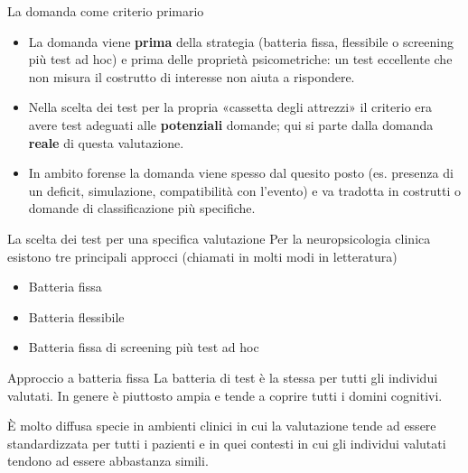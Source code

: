\documentclass[
  ignorenonframetext,
  aspectratio=169,
]{beamer}
\providecommand{\tightlist}{%
  \setlength{\itemsep}{0pt}\setlength{\parskip}{0pt}}
\begin{document}
\begin{frame}{La domanda come criterio primario}
\label{la-domanda-come-criterio-primario}
\small

\begin{itemize}
\tightlist
\item
  La domanda viene \textbf{prima} della strategia (batteria fissa,
  flessibile o screening più test ad hoc) e prima delle proprietà
  psicometriche: un test eccellente che non misura il costrutto di
  interesse non aiuta a rispondere. \pause
\item
  Nella scelta dei test per la propria «cassetta degli attrezzi» il
  criterio era avere test adeguati alle \textbf{potenziali} domande; qui
  si parte dalla domanda \textbf{reale} di questa valutazione. \pause
\item
  In ambito forense la domanda viene spesso dal quesito posto (es.
  presenza di un deficit, simulazione, compatibilità con l'evento) e va
  tradotta in costrutti o domande di classificazione più specifiche.
\end{itemize}
\end{frame}

\begin{frame}{La scelta dei test per una specifica valutazione}
\label{la-scelta-dei-test-per-una-specifica-valutazione}
Per la neuropsicologia clinica esistono tre principali approcci
(chiamati in molti modi in letteratura)

\begin{itemize}
\tightlist
\item
  Batteria fissa
\item
  Batteria flessibile
\item
  Batteria fissa di screening più test ad hoc
\end{itemize}
\end{frame}

\begin{frame}{Approccio a batteria fissa}
\label{approccio-a-batteria-fissa}
La batteria di test è la stessa per tutti gli individui valutati. In
genere è piuttosto ampia e tende a coprire tutti i domini cognitivi.

È molto diffusa specie in ambienti clinici in cui la valutazione tende
ad essere standardizzata per tutti i pazienti e in quei contesti in cui
gli individui valutati tendono ad essere abbastanza simili.
\end{frame}
\end{document}
